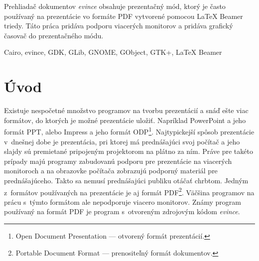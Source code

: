 \documentclass[12pt,oneside,final]{fithesis2}
\begin{document}
\begin{ThesisAbstract}
Prehliadač dokumentov \emph{evince} obsahuje prezentačný mód, ktorý je často používaný na prezentácie vo formáte PDF vytvorené pomocou LaTeX Beamer triedy. Táto práca pridáva podporu viacerých monitorov a pridáva grafický časovač do prezentačného módu.
\end{ThesisAbstract}

\begin{ThesisKeyWords}
Cairo, evince, GDK, GLib, GNOME, GObject, GTK+, LaTeX Beamer
\end{ThesisKeyWords}
 
\MainMatter
\sloppy
\setcounter{tocdepth}{3}
\tableofcontents 
 
\chapter{Úvod}

Existuje nespočetné množstvo programov na tvorbu prezentácií a snáď ešte viac formátov, do ktorých je možné prezentácie uložiť. Napríklad PowerPoint a jeho formát PPT, alebo Impress a jeho formát ODP\footnote{Open Document Presentation --- otvorený formát prezentácií.}. Najtypickejší spôsob prezentácie v~dnešnej dobe je prezentácia, pri ktorej má prednášajúci svoj počítač a jeho slajdy sú premietané pripojeným projektorom na plátno za ním. Práve pre takéto prípady majú programy zabudovanú podporu pre prezentácie na viacerých monitoroch a na obrazovke počítača zobrazujú podporný materiál pre prednášajúceho. Takto sa nemusí prednášajúci publiku otáčať chrbtom. Jedným z~formátov používaných na prezentácie je aj formát PDF\footnote{Portable Document Format --- prenositeľný formát dokumentov.}. Väčšina programov na prácu s~týmto formátom ale nepodporuje viacero monitorov. Známy program používaný na formát PDF je program s~otvoreným zdrojovým kódom \emph{evince}.
\end{document}
